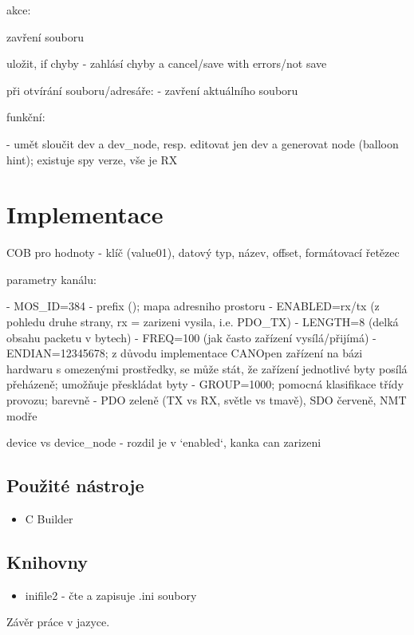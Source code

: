 \documentclass[
  field=ainfk,
  biblatex,
  glossaries,
  index
]{kidiplom}
\begin{document}
akce:

zavření souboru 

uložit, if chyby - zahlásí chyby a cancel/save with errors/not save

při otvírání souboru/adresáře:
- zavření aktuálního souboru
 
funkční:

 - umět sloučit dev a dev_node, resp. editovat jen dev a generovat node (balloon hint); existuje spy verze, vše je RX

\section{Implementace}
COB
pro hodnoty - klíč (value01), datový typ, název, offset, formátovací řetězec

parametry kanálu:
 
 - MOS_ID=384 - prefix (); mapa adresniho prostoru
 - ENABLED=rx/tx (z pohledu druhe strany, rx = zarizeni vysila, i.e. PDO_TX)
 - LENGTH=8 (delká obsahu packetu v bytech)
 - FREQ=100 (jak často zařízení vysílá/přijímá)
 - ENDIAN=12345678; z důvodu implementace CANOpen zařízení na bázi hardwaru s omezenými prostředky, se může stát, že zařízení jednotlivé byty posílá přeházeně; umožňuje přeskládat byty
 - GROUP=1000; pomocná klasifikace třídy provozu; barevně - PDO zeleně (TX vs RX, světle vs tmavě), SDO červeně, NMT modře

 device vs device_node - rozdil je v `enabled`, kanka can zarizeni

\subsection{Použité nástroje}

\begin{itemize}
  \item C Builder
\end{itemize}

\subsection {Knihovny}

\begin{itemize}
  \item inifile2 - čte a zapisuje .ini soubory
\end{itemize}

\begin{kiconclusions}
Závěr práce v  jazyce.
\end{kiconclusions}
\end{document}
